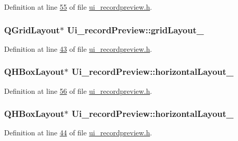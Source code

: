 Definition at line \hyperlink{a00140_source_l00055}{55} of file \hyperlink{a00140_source}{ui\+\_\+recordpreview.\+h}.

\hypertarget{a00081_a21cc18536b3c91200eceb2e5e01d3293}{
\subsubsection[{grid\+Layout\+\_\+4}]{\setlength{\rightskip}{0pt plus 5cm}Q\+Grid\+Layout$\ast$ Ui\+\_\+record\+Preview\+::grid\+Layout\+\_}}\label{a00081_a21cc18536b3c91200eceb2e5e01d3293}


Definition at line \hyperlink{a00140_source_l00043}{43} of file \hyperlink{a00140_source}{ui\+\_\+recordpreview.\+h}.

\hypertarget{a00081_a14cf293099dc18a097ecd71460db1701}{
\subsubsection[{horizontal\+Layout\+\_\+3}]{\setlength{\rightskip}{0pt plus 5cm}Q\+H\+Box\+Layout$\ast$ Ui\+\_\+record\+Preview\+::horizontal\+Layout\+\_}}\label{a00081_a14cf293099dc18a097ecd71460db1701}


Definition at line \hyperlink{a00140_source_l00056}{56} of file \hyperlink{a00140_source}{ui\+\_\+recordpreview.\+h}.

\hypertarget{a00081_a0a28f44d5179dd3cd2c84f4a1ac581c8}{
\subsubsection[{horizontal\+Layout\+\_\+4}]{\setlength{\rightskip}{0pt plus 5cm}Q\+H\+Box\+Layout$\ast$ Ui\+\_\+record\+Preview\+::horizontal\+Layout\+\_}}\label{a00081_a0a28f44d5179dd3cd2c84f4a1ac581c8}


Definition at line \hyperlink{a00140_source_l00044}{44} of file \hyperlink{a00140_source}{ui\+\_\+recordpreview.\+h}.

